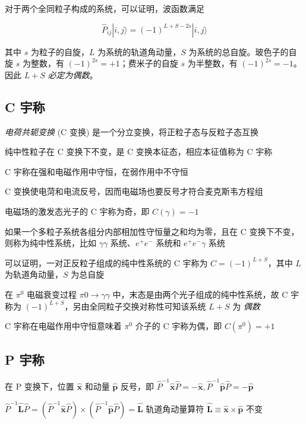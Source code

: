 对于两个全同粒子构成的系统，可以证明，波函数满足

\begin{equation}
    \hat{P}_{ij} |i, j\rangle = (-1)^{L+S-2s} |i, j \rangle
\end{equation}

其中 $s$ 为粒子的自旋，$L$ 为系统的轨道角动量，$S$ 为系统的总自旋。玻色子的自旋 $s$ 为整数，有 $(-1)^{2s} = +1$；费米子的自旋 $s$ 为半整数，有 $(-1)^{2s} = -1$。因此 $L+S$ \emph{必定为偶数}。

\subsection{C 宇称}

\emph{电荷共轭变换} (C 变换) 是一个分立变换，将正粒子态与反粒子态互换

纯中性粒子在 C 变换下不变，是 C 变换本征态，相应本征值称为 C 宇称

C 宇称在强和电磁作用中守恒，在弱作用中不守恒

C 变换使电菏和电流反号，因而电磁场也要反号才符合麦克斯韦方程组

电磁场的激发态光子的 C 宇称为奇，即 $C(\gamma) = -1$

如果一个多粒子系统各组分内部相加性守恒量之和均为零，且在 C 变换下不变，则称为纯中性系统，比如 $\gamma\gamma$ 系统、$e^+ e^-$ 系统和 $e^+ e^- \gamma$ 系统

可以证明，一对正反粒子组成的纯中性系统的 C 宇称为 $C = (-1)^{L+S}$，其中 $L$ 为轨道角动量，$S$ 为总自旋

在 $\pi^0$ 电磁衰变过程 $\pi0 \to \gamma\gamma$ 中，末态是由两个光子组成的纯中性系统，故 C 宇称为 $(-1)^{L+S}$，另由全同粒子交换对称性可知该系统 $L+S$ 为 \emph{偶数}

C 宇称在电磁作用中守恒意味着 $\pi^0$ 介子的 C 宇称为偶，即 $C(\pi^0) = +1$

\subsection{P 宇称}

在 P 变换下，位置 $\hat{\mathbf{x}}$ 和动量 $\hat{\mathbf{p}}$ 反号，即 $\hat{P}^{-1} \hat{\mathbf{x}} \hat{P} = -\hat{\mathbf{x}}, \hat{P}^{-1} \hat{\mathbf{p}} \hat{P} = -\hat{\mathbf{p}}$

$\hat{P}^{-1} \hat{\mathbf{L}} \hat{P} = (\hat{P}^{-1} \hat{\mathbf{x}} \hat{P}) \times (\hat{P}^{-1} \hat{\mathbf{p}} \hat{P}) = \hat{\mathbf{L}}$ 轨道角动量算符 $\hat{\mathbf{L}} \equiv \hat{\mathbf{x}} \times \hat{\mathbf{p}}$ 不变

